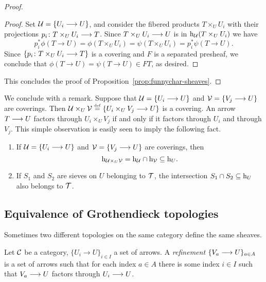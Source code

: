 \begin{2   CONTRAVARIANT FUNCTORS}
\begin{2.3 Sheaves in Grothendieck topologies}
\begin{proof}
\begin{proof}
Set $\mathcal{U} = \{U_{i} \longrightarrow U\}$, and consider the fibered products $T \times_{U} U_{i}$ with their projections $p_{i}\colon T \times_{U} U_{i} \arr T$. Since $T \times_{U} U_{i} \arr U$ is in $\mathrm{h}_{\mathcal{U}}(T \times_{U} U_{i})$ we have
   \[
   p_{i}^{*}\phi(T \to U) = \phi(T \times_{U} U_{i}) = 
   \psi(T \times_{U} U_{i}) = p_{i}^{*}\psi(T \to U).
   \]
Since $\{p_{i}\colon T \times_{U} U_{i} \arr T\}$ is a covering and $F$ is a separated presheaf, we conclude that $\phi(T \to U) = \psi(T \to U) \in FT$, as desired.
\end{proof}

This concludes the proof of Proposition~\ref{prop:funnychar-sheaves}.
\end{proof}

We conclude with a remark. Suppose that $\mathcal{U} = \{U_{i}\longrightarrow U\}$ and $\mathcal{V} = \{V_{j}\longrightarrow U\}$ are coverings. Then $\mathcal{U} \times_{U} \mathcal{V} \overset{\mathrm{\scriptscriptstyle def}} = \{U_{i}\times_{U} V_{j}\longrightarrow U\}$ is a covering. An arrow $T \arr U$ factors through $U_{i}\times_{U} V_{j}$ if and only if it factors through $U_{i}$ and through $V_{j}$. This simple observation is easily seen to imply the following fact.

\begin{proposition}\label{prop:directed-sieves}\hfil
\begin{enumerate}

\item If $\mathcal{U} = \{U_{i}\longrightarrow U\}$ and $\mathcal{V} = \{V_{j}\longrightarrow U\}$ are coverings, then
   \[
   \mathrm{h}_{\mathcal{U} \times_{U} \mathcal{V}} = \mathrm{h}_{\mathcal{U}} \cap \mathrm{h}_{\mathcal{V}} \subseteq \mathrm{h}_{U}.
   \]

\item If $S_{1}$ and $S_{2}$ are sieves on $U$ belonging to $\mathcal{T}$, the intersection $S_{1} \cap S_{2} \subseteq \mathrm{h}_{U}$ also belongs to $\mathcal{T}$.
\end{enumerate}

\end{proposition}




\subsection{Equivalence of Grothendieck topologies}

Sometimes two different to\-pol\-ogies on the same category define the same sheaves.

\begin{definition}
Let $\mathcal{C}$ be a category, $\{U_i \to U\}_{i \in I}$ a set of arrows. A \emph{refinement}%
 $\{V_a \arr U\}_{a \in A}$ is a set of arrows such that for each index $a \in A$ there is some index $i \in I$ such that $V_a \arr U$ factors through $U_i \arr U$.
\end{definition}


\end{2.3 Sheaves in Grothendieck topologies}
\end{2   CONTRAVARIANT FUNCTORS}
